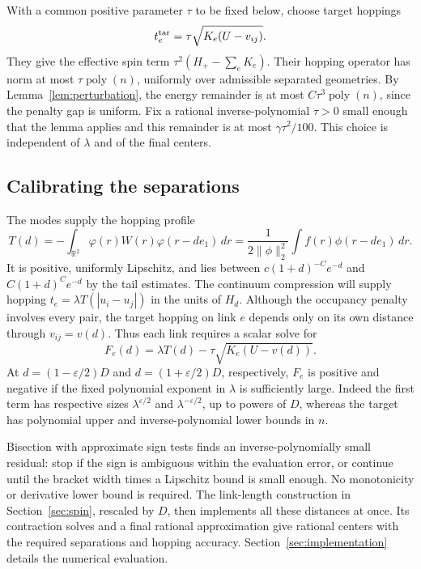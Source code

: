 With a common positive parameter \(\tau\) to be fixed below, choose
target hoppings
\[
                  t_e^{\rm tar}=\tau\sqrt{K_e(U-v_{ij})}.
\]
They give the effective spin term
\(\tau^2(H_+-\sum_e K_e)\). Their hopping operator has norm at most
\(\tau\operatorname{poly}(n)\), uniformly over admissible separated
geometries. By Lemma~\ref{lem:perturbation}, the energy remainder is at
most \(C\tau^3\operatorname{poly}(n)\), since the penalty gap is
uniform. Fix a rational inverse-polynomial \(\tau>0\) small enough
that the lemma applies and this remainder is at most
\(\gamma\tau^2/100\). This choice is independent of \(\lambda\)
and of the final centers.

\subsection{Calibrating the separations}

The modes supply the hopping profile
\[
 T(d)=-\int_{\mathbb R^2}\varphi(r)W(r)\varphi(r-d e_1)\,dr
     =\frac{1}{2\|\phi\|_2^2}\int f(r)\phi(r-d e_1)\,dr .
\]
It is positive, uniformly Lipschitz, and lies between
\(c(1+d)^{-C}e^{-d}\) and \(C(1+d)^Ce^{-d}\) by the tail
estimates. The continuum compression will supply hopping
\(t_e=\lambda T(|u_i-u_j|)\) in the units of \(H_d\). Although the
occupancy penalty involves every pair, the target hopping on link
\(e\) depends only on its own distance through \(v_{ij}=v(d)\).
Thus each link requires a scalar solve for
\[
           F_e(d)=\lambda T(d)-\tau\sqrt{K_e(U-v(d))}.
\]
At \(d=(1-\varepsilon/2)D\) and \(d=(1+\varepsilon/2)D\),
respectively, \(F_e\) is positive and negative if the fixed polynomial
exponent in \(\lambda\) is sufficiently large. Indeed the first
term has respective sizes \(\lambda^{\varepsilon/2}\) and
\(\lambda^{-\varepsilon/2}\), up to powers of \(D\), whereas the
target has polynomial upper and inverse-polynomial lower bounds in
\(n\).

Bisection with approximate sign tests finds an inverse-polynomially
small residual: stop if the sign is ambiguous within the evaluation
error, or continue until the bracket width times a Lipschitz bound is
small enough. No monotonicity or derivative lower bound is required.
The link-length construction in Section~\ref{sec:spin}, rescaled by
\(D\), then implements all these distances at once. Its contraction
solves and a final rational approximation give rational centers with the
required separations and hopping accuracy. Section~\ref{sec:implementation}
details the numerical evaluation.

